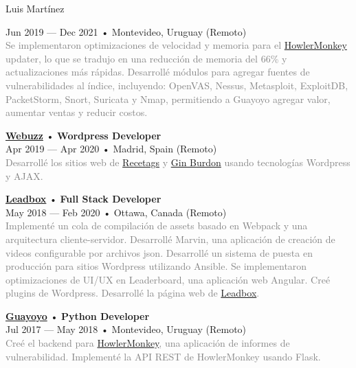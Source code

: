 \documentclass[12pt]{article}
\begin{document}
\begin{cv}{Luis Mart\'inez}
\begin{minipage}[t]{0.55\textwidth}
{      Jun 2019 --- Dec 2021 • Montevideo, Uruguay (Remoto)\\
      \footnotesize{\textcolor{gray}{Se implementaron optimizaciones de velocidad y memoria para el \href{https://howlermonkey.io}{HowlerMonkey} updater, lo que se tradujo en una reducción de memoria del 66\% y actualizaciones más rápidas. Desarrollé módulos para agregar fuentes de vulnerabilidades al índice, incluyendo: OpenVAS, Nessus, Metasploit, ExploitDB, PacketStorm, Snort, Suricata y Nmap, permitiendo a Guayoyo agregar valor, aumentar ventas y reducir costos.}}\\
    }\vspace{0.125em}
    \parbox[t]{\linewidth}{
      \textbf{\href{https://web.archive.org/web/20180413143616/https://webuzz.es/}{Webuzz}} • \textrm{\textbf{Wordpress Developer}}\\
      Apr 2019 --- Apr 2020 • Madrid, Spain (Remoto)\\
      \footnotesize{\textcolor{gray}{Desarrollé los sitios web de \href{https://web.archive.org/web/20201101021046/https://www.recetags.com/}{Recetags} y \href{https://web.archive.org/web/20191206145303/https://www.ginburdon.com/}{Gin Burdon} usando tecnologías Wordpress y AJAX.}}\\
    }\vspace{0.125em}
    \parbox[t]{\linewidth}{
      \textbf{\href{https://leadboxhq.com}{Leadbox}} • \textrm{\textbf{Full Stack Developer}}\\
      May 2018 --- Feb 2020 • Ottawa, Canada (Remoto)\\
      \footnotesize{\textcolor{gray}{Implementé un cola de compilación de assets basado en Webpack y una arquitectura cliente-servidor. Desarrollé Marvin, una aplicación de creación de videos configurable por archivos json. Desarrollé un sistema de puesta en producción para sitios Wordpress utilizando Ansible. Se implementaron optimizaciones de UI/UX en Leaderboard, una aplicación web Angular. Creé plugins de Wordpress. Desarrollé la página web de \href{https://leadboxhq.com}{Leadbox}.}}\\
    }\vspace{0.125em}
    \parbox[t]{\linewidth}{
      \textbf{\href{https://guayoyo.io}{Guayoyo}} • \textrm{\textbf{Python Developer}}\\
      Jul 2017 --- May 2018 • Montevideo, Uruguay (Remoto)\\
      \footnotesize{\textcolor{gray}{Creé el backend para \href{https://howlermonkey.io}{HowlerMonkey}, una aplicación de informes de vulnerabilidad. Implementé la API REST de HowlerMonkey usando Flask.}}\\
}
\end{minipage}
\end{cv}
\end{document}
